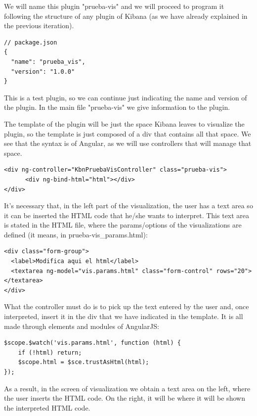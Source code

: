\documentclass[a4paper, 12pt]{book}
\begin{document}
We will name this plugin "prueba-vis" and we will proceed to program it following the structure of any plugin of Kibana (as we have already explained in the previous iteration).

\begin{lstlisting}[frame=single]
// package.json
{
  "name": "prueba_vis",
  "version": "1.0.0"
}
\end{lstlisting}

This is a test plugin, so we can continue just indicating the name and version of the plugin. In the main file "prueba-vis" we give information to the plugin.

The template of the plugin will be just the space Kibana leaves to visualize the plugin, so the template is just composed of a div that contains all that space. We see that the syntax is of Angular, as we will use controllers that will manage that space.

\begin{lstlisting}[frame=single]
<div ng-controller="KbnPruebaVisController" class="prueba-vis">
      <div ng-bind-html="html"></div>
</div>
\end{lstlisting}

It’s necessary that, in the left part of the visualization, the user has a text area so it can be inserted the HTML code that he/she wants to interpret. This text area is stated in the HTML file, where the params/options of the visualizations are defined (it means, in prueba-vis\_params.html):

\begin{lstlisting}[frame=single]
<div class="form-group">
  <label>Modifica aqui el html</label>
  <textarea ng-model="vis.params.html" class="form-control" rows="20"></textarea>
</div>
\end{lstlisting}

What the controller must do is to pick up the text entered by the user and, once interpreted, insert it in the div that we have indicated in the template. It is all made through elements and modules of AngularJS:

\begin{lstlisting}[frame=single]
$scope.$watch('vis.params.html', function (html) {
    if (!html) return;
    $scope.html = $sce.trustAsHtml(html);
});
\end{lstlisting}

As a result, in the screen of visualization we obtain a text area on the left, where the user inserts the HTML code. On the right, it will be where it will be shown the interpreted HTML code.
\end{document}
